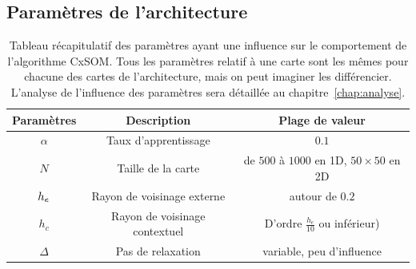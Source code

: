 \subsection{Paramètres de l'architecture}

\begin{table}
\caption{Tableau récapitulatif des paramètres ayant une influence sur le comportement de l'algorithme CxSOM. Tous les paramètres relatif à une carte sont les mêmes pour chacune des cartes de l'architecture, mais on peut imaginer les différencier. L'analyse de l'influence des paramètres sera détaillée au chapitre~\ref{chap:analyse}.}
\hfill
\begin{tabular}{|c|c|c|}
\hline
Paramètres & Description & Plage de valeur \\
\hline
$\alpha$ & Taux d'apprentissage & $0.1$ \\
$N$ & Taille de la carte & de $500$ à $1000$ en 1D, $50 \times 50$ en 2D \\
$h_e$ & Rayon de voisinage externe & autour de $0.2$ \\
$h_c$ & Rayon de voisinage contextuel & D'ordre $\frac{h_e}{10}$ ou inférieur) \\
$\Delta$ & Pas de relaxation & variable, peu d'influence\\
\hline
\end{tabular}
\end{table}



